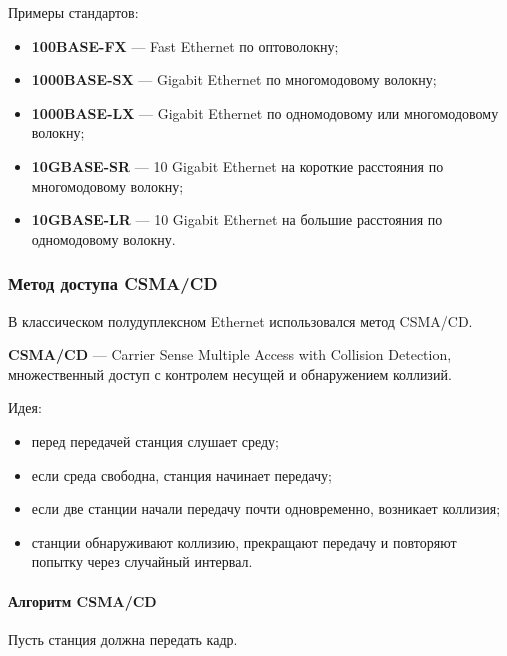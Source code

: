 \documentclass[12pt,a4paper]{article}
\begin{document}
Примеры стандартов:
\begin{itemize}
    \item \textbf{100BASE-FX} --- Fast Ethernet по оптоволокну;
    \item \textbf{1000BASE-SX} --- Gigabit Ethernet по многомодовому волокну;
    \item \textbf{1000BASE-LX} --- Gigabit Ethernet по одномодовому или многомодовому волокну;
    \item \textbf{10GBASE-SR} --- 10 Gigabit Ethernet на короткие расстояния по многомодовому волокну;
    \item \textbf{10GBASE-LR} --- 10 Gigabit Ethernet на большие расстояния по одномодовому волокну.
\end{itemize}

\subsubsection{Метод доступа CSMA/CD}

В классическом полудуплексном Ethernet использовался метод CSMA/CD.

\textbf{CSMA/CD} --- Carrier Sense Multiple Access with Collision Detection, множественный доступ с контролем несущей и обнаружением коллизий.

Идея:
\begin{itemize}
    \item перед передачей станция слушает среду;
    \item если среда свободна, станция начинает передачу;
    \item если две станции начали передачу почти одновременно, возникает коллизия;
    \item станции обнаруживают коллизию, прекращают передачу и повторяют попытку через случайный интервал.
\end{itemize}

\paragraph{Алгоритм CSMA/CD}

Пусть станция должна передать кадр.
\end{document}
